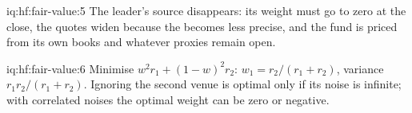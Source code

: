 \begin{solution}{iq:hf:fair-value:5}
The leader's source disappears: its weight must go to zero at the close, the quotes widen because the  becomes less precise, and the fund
is priced from its own books and whatever proxies remain open.
\end{solution}

\begin{solution}{iq:hf:fair-value:6}
Minimise $w^2r_1+(1-w)^2r_2$: $w_1=r_2/(r_1+r_2)$, variance $r_1r_2/(r_1+r_2)$. Ignoring the second venue is optimal only if its noise is infinite;
with correlated noises the optimal weight can be zero or negative.
\end{solution}
